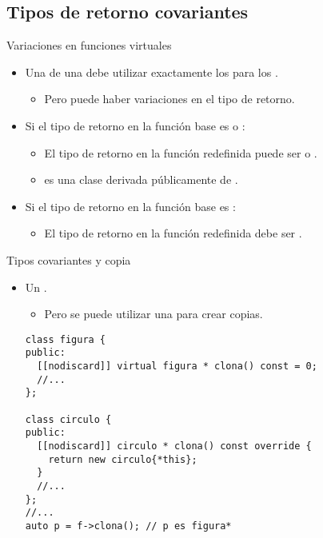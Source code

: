\subsection{Tipos de retorno covariantes}

\begin{frame}[t,fragile]{Variaciones en funciones virtuales}
\begin{itemize}
  \item Una  de una  debe utilizar 
        exactamente los  para los .
    \begin{itemize}
      \item Pero puede haber variaciones en el tipo de retorno.
    \end{itemize}

  \item Si el tipo de retorno en la función base es  o :
    \begin{itemize}
      \item El tipo de retorno en la función redefinida puede ser  o .
      \item {} es una clase derivada públicamente de .
    \end{itemize}

  \item Si el tipo de retorno en la función base es :
    \begin{itemize}
      \item El tipo de retorno en la función redefinida debe ser .
    \end{itemize}
\end{itemize}
\end{frame}

\begin{frame}[t,fragile]{Tipos covariantes y copia}
\begin{itemize}
  \item Un   .
    \begin{itemize}
      \item Pero se puede utilizar una 
            para crear copias.
    \end{itemize}
\begin{lstlisting}
class figura {
public:
  [[nodiscard]] virtual figura * clona() const = 0;
  //... 
};

class circulo {
public:
  [[nodiscard]] circulo * clona() const override {
    return new circulo{*this};
  }
  //...
};
//...
auto p = f->clona(); // p es figura*
\end{lstlisting}
\end{itemize}
\end{frame}


